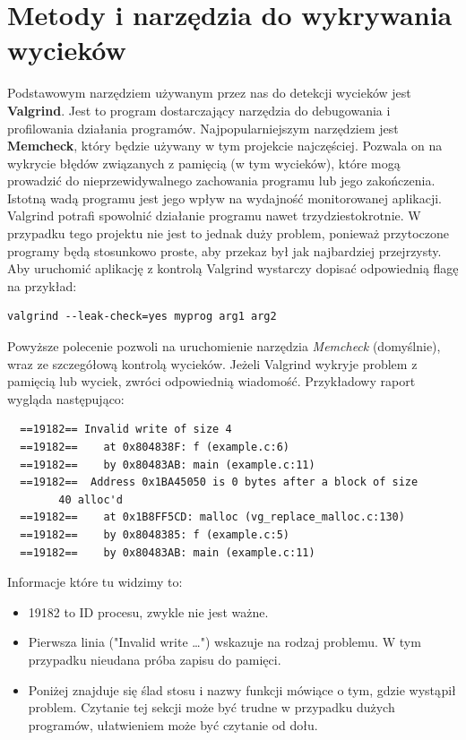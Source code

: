 \documentclass[12pt]{article}
\begin{document}
\section{Metody i narzędzia do wykrywania wycieków}
Podstawowym narzędziem używanym przez nas do detekcji wycieków jest \textbf{Valgrind}. Jest to program dostarczający narzędzia do debugowania i profilowania działania programów. Najpopularniejszym narzędziem jest \textbf{Memcheck}, który będzie używany w tym projekcie najczęściej. Pozwala on na wykrycie błędów związanych z pamięcią (w tym wycieków), które mogą prowadzić do nieprzewidywalnego zachowania programu lub jego zakończenia. Istotną wadą programu jest jego wpływ na wydajność monitorowanej aplikacji. Valgrind potrafi spowolnić działanie programu nawet trzydziestokrotnie. W przypadku tego projektu nie jest to jednak duży problem, ponieważ przytoczone programy będą stosunkowo proste, aby przekaz był jak najbardziej przejrzysty.\\
Aby uruchomić aplikację z kontrolą Valgrind wystarczy dopisać odpowiednią flagę na przykład:
\begin{lstlisting}
valgrind --leak-check=yes myprog arg1 arg2
\end{lstlisting}
Powyższe polecenie pozwoli na uruchomienie narzędzia \textit{Memcheck} (domyślnie), wraz ze szczegółową kontrolą wycieków. Jeżeli Valgrind wykryje problem z pamięcią lub wyciek, zwróci odpowiednią wiadomość. Przykładowy raport wygląda następująco:
\begin{lstlisting}
  ==19182== Invalid write of size 4
  ==19182==    at 0x804838F: f (example.c:6)
  ==19182==    by 0x80483AB: main (example.c:11)
  ==19182==  Address 0x1BA45050 is 0 bytes after a block of size 
		40 alloc'd
  ==19182==    at 0x1B8FF5CD: malloc (vg_replace_malloc.c:130)
  ==19182==    by 0x8048385: f (example.c:5)
  ==19182==    by 0x80483AB: main (example.c:11)
\end{lstlisting}
\newpage
Informacje które tu widzimy to:
\begin{itemize}
  \item 19182 to ID procesu, zwykle nie jest ważne.
  \item Pierwsza linia ("Invalid write \ldots ") wskazuje na rodzaj problemu. W tym przypadku nieudana próba zapisu do pamięci.
  \item Poniżej znajduje się ślad stosu i nazwy funkcji mówiące o tym, gdzie wystąpił problem. Czytanie tej sekcji może być trudne w przypadku dużych programów, ułatwieniem może być czytanie od dołu.
\end{itemize}
\newpage
\end{document}
